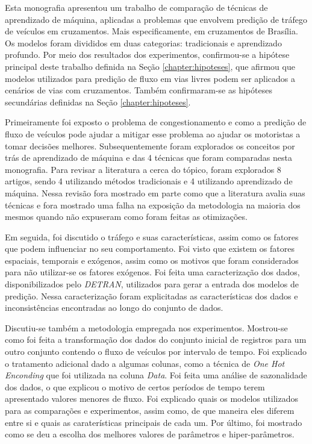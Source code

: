 Esta monografia apresentou um trabalho de comparação de técnicas de aprendizado de máquina, aplicadas a problemas que envolvem predição de tráfego de veículos em cruzamentos. Mais especificamente, em cruzamentos de Brasília. Os modelos foram divididos em duas categorias: tradicionais e aprendizado profundo. Por meio dos resultados dos experimentos, confirmou-se a hipótese principal deste trabalho definida na Seção \ref{chapter:hipoteses}, que afirmou que modelos utilizados para predição de fluxo em vias livres podem ser aplicados a cenários de vias com cruzamentos. Também confirmaram-se as hipóteses secundárias definidas na Seção \ref{chapter:hipoteses}.%

Primeiramente foi exposto o problema de congestionamento e como a predição de fluxo de veículos pode ajudar a mitigar esse problema ao ajudar os motoristas a tomar decisões melhores. Subsequentemente foram explorados os conceitos por trás de aprendizado de máquina e das 4 técnicas que foram comparadas nesta monografia. Para revisar a literatura a cerca do tópico, foram explorados 8 artigos, sendo 4 utilizando métodos tradicionais e 4 utilizando aprendizado de máquina. Nessa revisão fora mostrado em parte como que a literatura avalia suas técnicas e fora mostrado uma falha na exposição da metodologia na maioria dos mesmos quando não expuseram como foram feitas as otimizações.  

Em seguida, foi discutido o tráfego e suas características, assim como os fatores que podem influenciar no seu comportamento. Foi visto que existem os fatores espaciais, temporais e exógenos, assim como os motivos que foram considerados para não utilizar-se os fatores exógenos. Foi feita uma caracterização dos dados, disponibilizados pelo \textit{\acrshort{DETRAN}}, utilizados para gerar a entrada dos modelos de predição. Nessa caracterização foram explicitadas as características dos dados e inconsistências encontradas ao longo do conjunto de dados.

Discutiu-se também a metodologia empregada nos experimentos. Mostrou-se como foi feita a transformação dos dados do conjunto inicial de registros para um outro conjunto contendo o fluxo de veículos por intervalo de tempo. Foi explicado o tratamento adicional dado a algumas colunas, como a técnica de \textit{One Hot Enconding} que foi utilizada na coluna \textit{Data}. Foi feita uma análise de sazonalidade dos dados, o que explicou o motivo de certos períodos de tempo terem apresentado valores menores de fluxo. Foi explicado quais os modelos utilizados para as comparações e experimentos, assim como, de que maneira eles diferem entre si e quais as caraterísticas principais de cada um. Por último, foi mostrado como se deu a escolha dos melhores valores de parâmetros e hiper-parâmetros.

